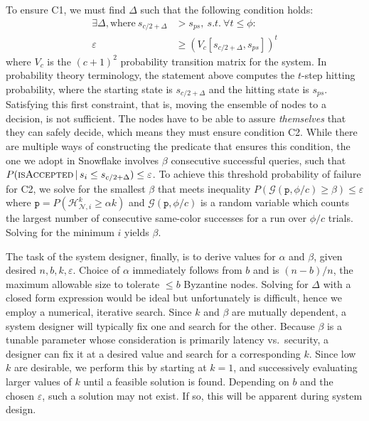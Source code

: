 \documentclass[letterpaper,twocolumn,10pt]{article}
\theoremstyle{definition}
\newcommand{\Jon}[1]{{\color{blue} \textbf{Jon: } #1}}
\begin{document}
\begin{appendices}
\noindent To ensure C1, we must find $\Delta$ such that the following condition holds:
\begin{equation}
\begin{split}
    \exists \Delta, \text{where}\ s_{c/2 + \Delta} &> s_{ps},\ s.t.\ \forall t \leq \phi:\\
    \varepsilon &\geq (V_c[s_{c/2 + \Delta}, s_{ps}])^t
\end{split}
\end{equation}
where $V_c$ is the $(c+1)^2$ probability transition matrix for the system.
In probability theory terminology, the statement above computes the $t$-step hitting probability, where the starting state is $s_{c/2 + \Delta}$ and the hitting state is $s_{ps}$.
Satisfying this first constraint, that is, moving the ensemble of nodes to a decision, is not sufficient. The nodes have to be able to assure \emph{themselves} that they can safely decide, which means they must ensure condition C2.
While there are multiple ways of constructing the predicate that ensures this condition, the one we adopt in Snowflake involves $\beta$ consecutive successful queries, such that $P(\textsc{isAccepted} \,|\, s_i \leq s_{c/2 + \Delta}) \leq \varepsilon$. 
To achieve this threshold probability of failure for C2, we solve for the smallest $\beta$ that meets inequality
$P(\mathcal{G}(\mathtt{p}, \phi/c) \geq \beta) \leq \varepsilon$
where $\mathtt{p} = P(\mathcal{H}_{\mathcal{N}, i}^k \geq \alpha k)$ and $\mathcal{G}(\mathtt{p}, \phi/c)$ is a random variable which counts the largest number of consecutive same-color successes for a run over $\phi/c$ trials.
Solving for the minimum $i$ yields $\beta$.

The task of the system designer, finally, is to derive values for $\alpha$ and $\beta$, given desired $n, b, k, \varepsilon$.
Choice of $\alpha$ immediately follows from $b$ and is $(n - b)/ n$, the maximum allowable size to tolerate $\leq b$ Byzantine nodes.
Solving for $\Delta$ with a closed form expression would be ideal but unfortunately is difficult, hence we employ a numerical, iterative search.
Since $k$ and $\beta$ are mutually dependent, a system designer will typically fix one and search for the other.
Because $\beta$ is a tunable parameter whose consideration is primarily latency vs.\ security, a designer can fix it at a desired value and search for a corresponding $k$.
Since low $k$ are desirable, we perform this by starting at $k=1$, and successively evaluating larger values of $k$ until a feasible solution is found.
Depending on $b$ and the chosen $\varepsilon$, such a solution may not exist. If so, this will be apparent during system design. 


\end{appendices}
\end{document}
